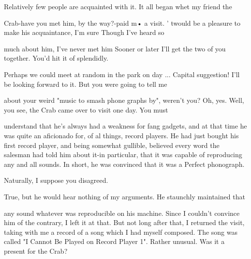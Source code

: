 \tortoise Relatively few people are acquainted with it. It all began whet my friend the\par
Crab-have you met him, by the way?-paid m• a visit. 
\achilles ' twould be a pleasure to make his acquaintance, I'm sure Though I've heard so\par
much about him, I've never met him 
\tortoise Sooner or later I'll get the two of you together. You'd hit it of splendidly.\par
Perhaps we could meet at random in the park on day ... 
\achilles Capital suggestion! I'll be looking forward to it. But you were going to tell me\par
about your weird "music to smash phone graphs by", weren't you? 
\tortoise Oh, yes. Well, you see, the Crab came over to visit one day. You must\par
understand that he's always had a weakness for fang gadgets, and at that time he was quite an aficionado for, of al things, record players. He had just bought his first record player, and being somewhat gullible, believed every word the salesman had told him about it-in particular, that it was capable of reproducing any and all sounds. In short, he was convinced that it was a Perfect phonograph. 








\achilles Naturally, I suppose you disagreed.\par

\tortoise True, but he would hear nothing of my arguments. He staunchly maintained that\par
any sound whatever was reproducible on his machine. Since I couldn't convince him of the contrary, I left it at that. But not long after that, I returned the visit, taking with me a record of a song which I had myself composed. The song was called "I Cannot Be Played on Record Player 1". 
\achilles Rather unusual. Was it a present for the Crab?\par

